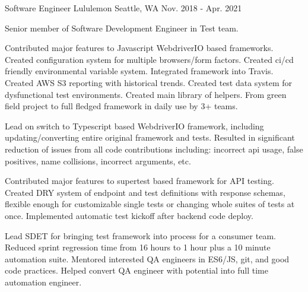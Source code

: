 \begin{cventries}
\cventry
{Software Engineer} %
{Lululemon} %
{Seattle, WA} %
{Nov. 2018 - Apr. 2021} %
{
\begin{cvitems}
\item[] {Senior member of Software Development Engineer in Test team.}
\item[]
\item {Contributed major features to Javascript WebdriverIO based frameworks. Created configuration system for multiple browsers/form factors. Created ci/cd friendly environmental variable system. Integrated framework into Travis. Created AWS S3 reporting with historical trends. Created test data system for dysfunctional test environments. Created main library of helpers. From green field project to full fledged framework in daily use by 3+ teams.}
\item {Lead on switch to Typescript based WebdriverIO framework, including updating/converting entire original framework and tests. Resulted in significant reduction of issues from all code contributions including: incorrect api usage, false positives, name collisions, incorrect arguments, etc.}
\item {Contributed major features to supertest based framework for API testing. Created DRY system of endpoint and test definitions with response schemas, flexible enough for customizable single tests or changing whole suites of tests at once. Implemented automatic test kickoff after backend code deploy.}
\item {Lead SDET for bringing test framework into process for a consumer team. Reduced sprint regression time from 16 hours to 1 hour plus a 10 minute automation suite. Mentored interested QA engineers in ES6/JS, git, and good code practices. Helped convert QA engineer with potential into full time automation engineer.}
\end{cvitems}
}


\end{cventries}
